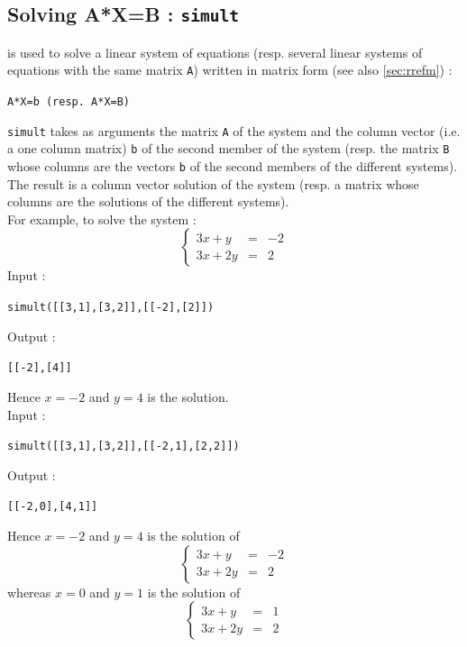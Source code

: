 \documentclass[a4paper,11pt]{book}
\begin{document}
\subsection{Solving A*X=B : {\tt simult}}
 is used to solve a linear system of equations (resp. 
several linear systems of equations with the same matrix {\tt A}) written 
in matrix form (see also \ref{sec:rrefm}) :
\begin{center}{\tt A*X=b  (resp. A*X=B)}\end{center}
{\tt simult} takes as arguments the matrix {\tt A} of the system and the 
column vector (i.e. a one column matrix) {\tt b} of the second 
member of the system (resp.
the matrix {\tt B} whose columns are the 
vectors {\tt b} of the second members of the different systems).\\
The result is a column vector solution of the system (resp. a matrix 
whose columns are the solutions of the different systems).\\
For example, to solve the system :
$$\left \{
\begin{array}{lcr} 3x + y & = &-2 \\3x +2y & =& 2 \end{array}\right.$$ 
Input  :
\begin{center}{\tt simult([[3,1],[3,2]],[[-2],[2]])}\end{center}
Output  :
\begin{center}{\tt [[-2],[4]]}\end{center}
Hence $x=-2$ and $y=4$ is the solution.\\
Input  :
\begin{center}{\tt simult([[3,1],[3,2]],[[-2,1],[2,2]])}\end{center}
Output :
\begin{center}{\tt [[-2,0],[4,1]]}\end{center}
Hence $x=-2$ and $y=4$ is the solution of
$$\left \{
\begin{array}{lcr} 3x + y & = &-2 \\3x +2y & =& 2 \end{array}\right.$$
whereas $x=0$ and $y=1$ is the solution of
$$\left \{
\begin{array}{lcr} 3x + y & = &1 \\3x +2y & =& 2 \end{array}\right.$$
\end{document}
